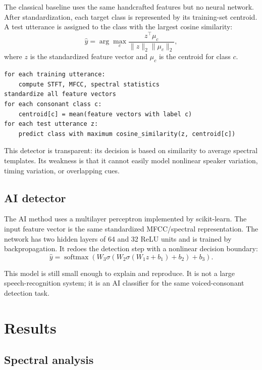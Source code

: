\documentclass[11pt]{article}
\begin{document}
The classical baseline uses the same handcrafted features but no neural network.  After standardization, each target class is represented by its training-set centroid.  A test utterance is assigned to the class with the largest cosine similarity:
\begin{equation}
    \hat{y} = \arg\max_c \frac{z^\top \mu_c}{\|z\|_2\|\mu_c\|_2},
\end{equation}
where $z$ is the standardized feature vector and $\mu_c$ is the centroid for class $c$.

\begin{lstlisting}[caption={Classical detector pseudocode.}]
for each training utterance:
    compute STFT, MFCC, spectral statistics
standardize all feature vectors
for each consonant class c:
    centroid[c] = mean(feature vectors with label c)
for each test utterance z:
    predict class with maximum cosine_similarity(z, centroid[c])
\end{lstlisting}

This detector is transparent: its decision is based on similarity to average spectral templates.  Its weakness is that it cannot easily model nonlinear speaker variation, timing variation, or overlapping cues.

\subsection{AI detector}

The AI method uses a multilayer perceptron implemented by scikit-learn.  The input feature vector is the same standardized MFCC/spectral representation.  The network has two hidden layers of 64 and 32 ReLU units and is trained by backpropagation.  It redoes the detection step with a nonlinear decision boundary:
\begin{equation}
    \hat{y}=\operatorname{softmax}(W_3\sigma(W_2\sigma(W_1z+b_1)+b_2)+b_3).
\end{equation}

This model is still small enough to explain and reproduce.  It is not a large speech-recognition system; it is an AI classifier for the same voiced-consonant detection task.

\section{Results}

\subsection{Spectral analysis}
\end{document}
